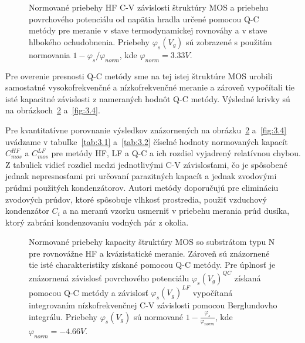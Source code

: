\begin{figure}[h!]\centering
  
  \caption[Normované priebehy HF C-V závislosti štruktúry MOS a
    priebehu povrchového potenciálu od napätia hradla určené pomocou
    Q-C metódy pre meranie v stave termodynamickej rovnováhy a v stave
    hlbokého ochudobnenia]{Normované priebehy HF C-V závislosti
    štruktúry MOS a priebehu povrchového potenciálu od napätia hradla
    určené pomocou Q-C metódy pre meranie v stave termodynamickej
    rovnováhy a v stave hlbokého ochudobnenia. Priebehy
    $\varphi_s(V_g)$ sú zobrazené s použitím normovania $1 - {\varphi_s}/{\varphi_{norm}}$, kde
    $\varphi_{norm}=3.33V$.}\label{fig:3.2}
\end{figure}

Pre overenie presnosti Q-C metódy sme na tej istej štruktúre MOS
urobili samostatné vysokofrekvenčné a nízkofrekvenčné meranie a
zároveň vypočítali tie isté kapacitné závislosti z nameraných hodnôt
Q-C metódy.  Výsledné krivky sú na obrázkoch~\ref{fig:3.3} a~\ref{fig:3.4}.

Pre kvantitatívne porovnanie výsledkov znázornených na
obrázku~\ref{fig:3.3} a~\ref{fig:3.4} uvádzame v tabuľke~\ref{tab:3.1}
a~\ref{tab:3.2} číselné hodnoty normovaných kapacít $C^{HF}_{mos}$ a
$C^{LF}_{mos}$ pre metódy HF, LF a Q-C a ich rozdiel vyjadrený
relatívnou chybou. Z tabuliek vidieť rozdiel medzi jednotlivými C-V
závislosťami, čo je spôsobené jednak nepresnosťami pri určovaní
parazitných kapacít a jednak zvodovými prúdmi použitých
kondenzátorov. Autori metódy doporučujú pre elimináciu zvodových
prúdov, ktoré spôsobuje vlhkosť prostredia, použiť vzduchový
kondenzátor $C_i$ a na meranú vzorku usmerniť v priebehu merania prúd
dusíka, ktorý zabráni kondenzovaniu vodných pár z okolia.

\newpage
\begin{figure}[h!]\centering
  
  \caption[Normované priebehy kapacity štruktúry MOS so substrátom
    typu N pre rovnovážne HF a kvázistatické meranie]{Normované
    priebehy kapacity štruktúry MOS so substrátom typu N pre
    rovnovážne HF a kvázistatické meranie. Zároveň sú znázornené tie
    isté charakteristiky získané pomocou Q-C metódy. Pre úplnosť je
    znázornená závislosť povrchového potenciálu
    ${\varphi_s(V_g)}^{QC}$ získaná pomocou Q-C metódy a závislosť
    ${\varphi_s(V_g)}^{LF}$ vypočítaná integrovaním nízkofrekvenčnej
    C-V závislosti pomocou Berglundovho integrálu.  Priebehy
    $\varphi_s(V_g)$ sú normované $1 -
    \frac{\varphi_s}{\varphi_{norm}}$, kde
    $\varphi_{norm}=-4.66V$.}\label{fig:3.3}
\end{figure}

